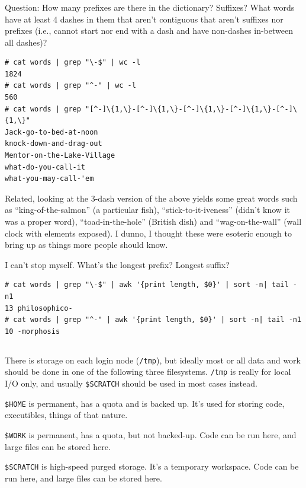 \documentclass{article}
\begin{document}
\subsubsection{}
Question: How many prefixes are there in the dictionary? Suffixes? What words have at least 4 dashes in them that aren't contiguous that aren't suffixes nor prefixes (i.e., cannot start nor end with a dash and have non-dashes in-between all dashes)?
\begin{verbatim}
# cat words | grep "\-$" | wc -l
1824
# cat words | grep "^-" | wc -l
560
# cat words | grep "[^-]\{1,\}-[^-]\{1,\}-[^-]\{1,\}-[^-]\{1,\}-[^-]\{1,\}" 
Jack-go-to-bed-at-noon
knock-down-and-drag-out
Mentor-on-the-Lake-Village
what-do-you-call-it
what-you-may-call-'em
\end{verbatim}

Related, looking at the 3-dash version of the above yields some great words such as ``king-of-the-salmon'' (a particular fish), ``stick-to-it-iveness'' (didn't know it was a proper word), ``toad-in-the-hole'' (British dish) and ``wag-on-the-wall'' (wall clock with elements exposed). I dunno, I thought these were esoteric enough to bring up as things more people should know.

I can't stop myself. What's the longest prefix? Longest suffix?
\begin{verbatim}
# cat words | grep "\-$" | awk '{print length, $0}' | sort -n| tail -n1
13 philosophico-
# cat words | grep "^-" | awk '{print length, $0}' | sort -n| tail -n1
10 -morphosis
\end{verbatim}

\subsection{}
There is storage on each login node (\texttt{/tmp}), but ideally most or all data and work should be done
in one of the following three filesystems. \texttt{/tmp} is really for local I/O only, and usually \texttt{\$SCRATCH} should
be used in most cases instead.

\texttt{\$HOME} is permanent, has a quota and is backed up. It's used for storing code, executibles, things of that nature.

\texttt{\$WORK} is permanent, has a quota, but not backed-up. Code can be run here, and large files can be stored here.

\texttt{\$SCRATCH} is high-speed purged storage. It's a temporary workspace. Code can be run here, and large files can be stored here.
\end{document}
